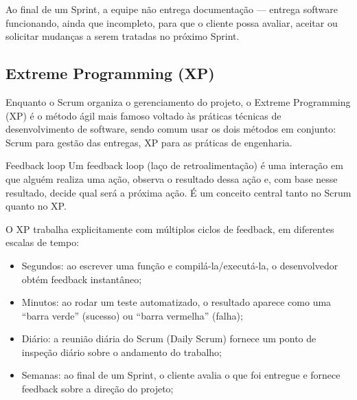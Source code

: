Ao final de um Sprint, a equipe não entrega documentação — entrega software funcionando, ainda que incompleto, para que o cliente possa avaliar, aceitar ou solicitar mudanças a serem tratadas no próximo Sprint.

\subsection{Extreme Programming (XP)}

Enquanto o Scrum organiza o gerenciamento do projeto, o Extreme Programming (XP) é o método ágil mais famoso voltado às práticas técnicas de desenvolvimento de software, sendo comum usar os dois métodos em conjunto: Scrum para gestão das entregas, XP para as práticas de engenharia.

\begin{infobox}{Feedback loop}
Um feedback loop (laço de retroalimentação) é uma interação em que alguém realiza uma ação, observa o resultado dessa ação e, com base nesse resultado, decide qual será a próxima ação. É um conceito central tanto no Scrum quanto no XP.
\end{infobox}

O XP trabalha explicitamente com múltiplos ciclos de feedback, em diferentes escalas de tempo:

\begin{itemize}
  \item Segundos: ao escrever uma função e compilá-la/executá-la, o desenvolvedor obtém feedback instantâneo;
\end{itemize}

\begin{itemize}
  \item Minutos: ao rodar um teste automatizado, o resultado aparece como uma “barra verde” (sucesso) ou “barra vermelha” (falha);
\end{itemize}

\begin{itemize}
  \item Diário: a reunião diária do Scrum (Daily Scrum) fornece um ponto de inspeção diário sobre o andamento do trabalho;
\end{itemize}

\begin{itemize}
  \item Semanas: ao final de um Sprint, o cliente avalia o que foi entregue e fornece feedback sobre a direção do projeto;
\end{itemize}

